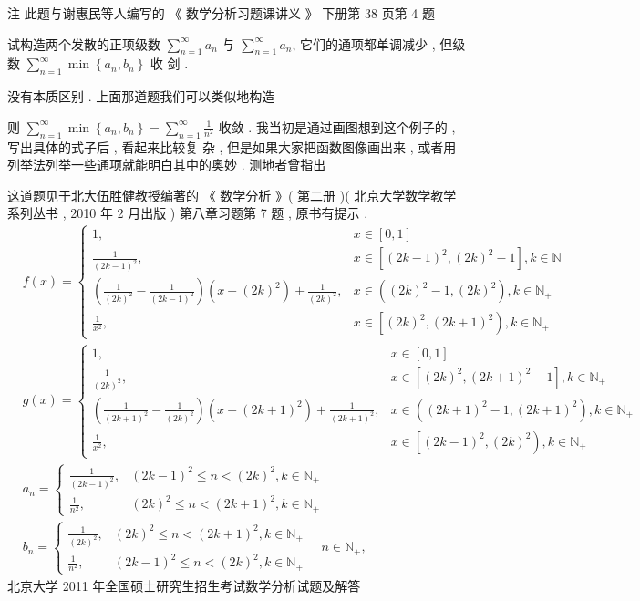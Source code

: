 \documentclass[10pt]{article}
\begin{document}
 注   此题与谢惠民等人编写的 《 数学分析习题课讲义 》 下册第  38  页第  4  题 

 试构造两个发散的正项级数  $\sum_{n=1}^{\infty} a_{n}$  与  $\sum_{n=1}^{\infty} a_{n}$,  它们的通项都单调减少 ,  但级数  $\sum_{n=1}^{\infty} \min \left\{a_{n}, b_{n}\right\}$  收   剑 .

 没有本质区别 .  上面那道题我们可以类似地构造 

 则  $\sum_{n=1}^{\infty} \min \left\{a_{n}, b_{n}\right\}=\sum_{n=1}^{\infty} \frac{1}{n^{2}}$  收敛 .  我当初是通过画图想到这个例子的 ,  写出具体的式子后 ,  看起来比较复   杂 ,  但是如果大家把函数图像画出来 ,  或者用列举法列举一些通项就能明白其中的奥妙 .  测地者曾指出 

 这道题见于北大伍胜健教授编著的 《 数学分析 》( 第二册 )( 北京大学数学教学系列丛书 , 2010  年  2  月出版 )  第八章习题第  7  题 ,  原书有提示 .
$$
\begin{aligned}
& f(x)= \begin{cases}1, & x \in[0,1] \\ \frac{1}{(2 k-1)^{2}}, & x \in\left[(2 k-1)^{2},(2 k)^{2}-1\right], k \in \mathbb{N} \\ \left(\frac{1}{(2 k)^{2}}-\frac{1}{(2 k-1)^{2}}\right)\left(x-(2 k)^{2}\right)+\frac{1}{(2 k)^{2}}, & x \in\left((2 k)^{2}-1,(2 k)^{2}\right), k \in \mathbb{N}_{+} \\ \frac{1}{x^{2}}, & x \in\left[(2 k)^{2},(2 k+1)^{2}\right), k \in \mathbb{N}_{+}\end{cases} \\
& g(x)= \begin{cases}1, & x \in[0,1] \\ \frac{1}{(2 k)^{2}}, & x \in\left[(2 k)^{2},(2 k+1)^{2}-1\right], k \in \mathbb{N}_{+} \\ \left(\frac{1}{(2 k+1)^{2}}-\frac{1}{(2 k)^{2}}\right)\left(x-(2 k+1)^{2}\right)+\frac{1}{(2 k+1)^{2}}, & x \in\left((2 k+1)^{2}-1,(2 k+1)^{2}\right), k \in \mathbb{N}_{+} \\ \frac{1}{x^{2}}, & x \in\left[(2 k-1)^{2},(2 k)^{2}\right), k \in \mathbb{N}_{+}\end{cases} \\
& a_{n}=\left\{\begin{array}{cl}\frac{1}{(2 k-1)^{2}}, & (2 k-1)^{2} \leqslant n<(2 k)^{2}, k \in \mathbb{N}_{+} \\\frac{1}{n^{2}}, & (2 k)^{2} \leqslant n<(2 k+1)^{2}, k \in \mathbb{N}_{+}\end{array}\right. \\
& b_{n}=\left\{\begin{array}{cl}\frac{1}{(2 k)^{2}}, & (2 k)^{2} \leqslant n<(2 k+1)^{2}, k \in \mathbb{N}_{+} \\\frac{1}{n^{2}}, & (2 k-1)^{2} \leqslant n<(2 k)^{2}, k \in \mathbb{N}_{+}\end{array} \quad n \in \mathbb{N}_{+},\right. 
\end{aligned}
$$
 北京大学  2011  年全国硕士研究生招生考试数学分析试题及解答     
\end{document}

